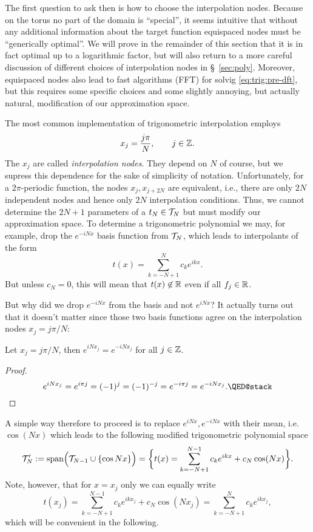 The first question to ask then is how to choose the interpolation nodes. Because
on the torus no part of the domain is ``special'', it seems intuitive that
without any additional information about the target function equispaced nodes
must be ``generically optimal''. We will prove in the remainder of this section
that it is in fact optimal up to a logarithmic factor, but will also return to a
more careful discussion of different choices of interpolation nodes in
\S~\ref{sec:poly}. Moreover, equispaced nodes also lead to fast algorithms (FFT)
for solvig \eqref{eq:trig:pre-dft}, but this requires some specific choices and
some slightly annoying, but actually natural, modification of our approximation
space. 

The most common implementation of trigonometric interpolation employs
\[
  x_j =  \frac{j \pi}{N},  \qquad j \in \mathbb{Z}.
\]
The $x_j$ are called {\em interpolation nodes}. They depend on $N$ of course, but we
supress this dependence for the sake of simplicity of notation. Unfortunately, 
for a $2\pi$-periodic function, the nodes $x_j, x_{j+2N}$ are equivalent, i.e., 
there are only $2N$ independent nodes and hence only $2N$ interpolation conditions. 
Thus, we cannot determine the $2N+1$ parameters of a $t_N \in \mathcal{T}_N$ but must 
modify our approximation space.  To determine a trigonometric polynomial we may, for example,
drop the $e^{-iNx}$ basis function from $\mathcal{T}_N$, which leads to
interpolants of the form
\[
    t(x) = \sum_{k = -N+1}^N c_k e^{ik x}.
\]
But unless $c_N = 0$, this will mean that $t(x) \not\in \mathbb{R}$ even if all $f_j \in
\mathbb{R}$. 

But why did we drop $e^{-iNx}$ from the basis and not $e^{i N x}$? It actually turns out that it doesn't matter since those two basis functions agree on the interpolation nodes $x_j = j \pi / N$:

\begin{lemma} \label{th:trig:baby-aliasing}
  Let $x_j = j \pi / N$, then $e^{iN x_j} = e^{-iNx_j}$ for all
  $j \in \mathbb{Z}$.
\end{lemma}
\begin{proof}
  \[
    e^{iNx_j} = e^{i \pi j} = (-1)^j = (-1)^{-j} = e^{-i\pi j} = e^{-iNx_j}.
    \qedhere
  \]
\end{proof}

A simple way therefore to proceed is to replace $e^{i N x}, e^{-i N x}$ with their mean, i.e. $\cos(Nx)$ which  leads to the following modified trigonometric polynomial space
\[
  \mathcal{T}_N' := {\rm span}\Big(\mathcal{T}_{N-1} \cup \{ \cos N x \} \Big)
    =  \bigg\{ t(x) = \sum_{k = -N+1}^{N-1} c_k e^{ikx} + c_N \cos(Nx) \bigg\}.
\]
Note, however, that for $x = x_j$ only we can equally write 
\[
  t(x_j) = \sum_{k = -N+1}^{N-1} c_k e^{ikx_j} + c_N \cos(Nx_j)
     = \sum_{k = -N+1}^{N} c_k e^{ikx_j},
\]
which will be convenient in the following. 


